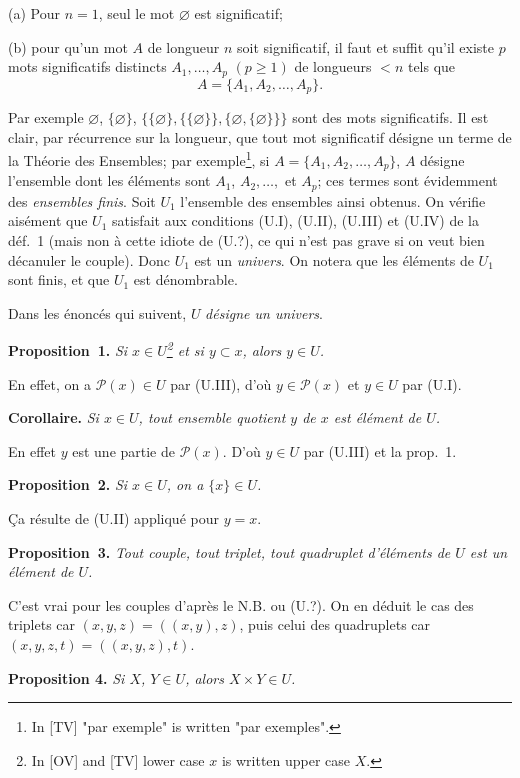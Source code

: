 \documentclass[12pt]{article}
\newcommand{\nn}{\noindent}
\begin{document}
\nn(a) Pour $n=1$, seul le mot $\varnothing$ est significatif;

\nn(b) pour qu'un mot $A$ de longueur $n$ soit significatif, il faut et suffit qu'il existe $p$ mots significatifs distincts $A_1,\ldots,A_p$ $(p\geq 1)$ de longueurs $ < n$ tels que
$$
A=\{A_1,A_2,\ldots,A_p\}.
$$

\nn Par exemple $\varnothing$, $\{\varnothing\}$, $\{\{\varnothing\},\{\{\varnothing\}\},\{\varnothing,\{\varnothing\}\}\}$ sont des mots significatifs. Il est clair, par récurrence sur la longueur, que tout mot significatif désigne un terme de la Théorie des Ensembles; par exemple\footnote{In [TV] "par exemple" is written "par exemples".}, si $A=\{A_1,A_2,\ldots,A_p\}$, $A$ désigne l'ensemble dont les éléments sont $A_1$, $A_2,\ldots,$ et $A_p$; ces termes sont évidemment des \emph{ensembles finis}. Soit $U_1$ l'ensemble des ensembles ainsi obtenus. On vérifie aisément que $U_1$ satisfait aux conditions (U.I), (U.II), (U.III) et (U.IV) de la déf.~1 (mais non à cette idiote de (U.?), ce qui n'est pas grave si on veut bien décanuler le couple). Donc $U_1$ est un \emph{univers}. On notera que les éléments de $U_1$ sont finis, et que $U_1$ est dénombrable.

Dans les énoncés qui suivent, $U$ \emph{désigne un univers}.

\nn\textbf{Proposition~1.} \emph{Si $x\in U$\footnote{In [OV] and [TV] lower case $x$ is written upper case $X$.} et si $y\subset x$, alors $y\in U$.}

En effet, on a $\mathcal{P}(x)\in U$ par (U.III), d'où $y\in\mathcal{P}(x)$ et $y\in U$ par (U.I).

\nn \textbf{Corollaire.} \emph{Si $x\in U$, tout ensemble quotient $y$ de $x$ est élément de $U$.}

En effet $y$ est une partie de $\mathcal{P}(x)$. D'où $y\in U$ par (U.III) et la prop.~1.

\nn\textbf{Proposition~2.} \emph{Si $x\in U$, on a $\{x\}\in U$.}

Ça résulte de (U.II) appliqué pour $y=x$.

\nn\textbf{Proposition~3.} \emph{Tout couple, tout triplet, tout quadruplet d'éléments de $U$ est un élément de $U$.}

C'est vrai pour les couples d'après le N.B. ou (U.?). On en déduit le cas des triplets car $(x,y,z)=((x,y),z)$, puis celui des quadruplets car $(x,y,z,t)=((x,y,z),t)$.

\nn\textbf{Proposition 4.} \emph{Si $X$, $Y\in U$, alors $X\times Y\in U$.}
\end{document}
